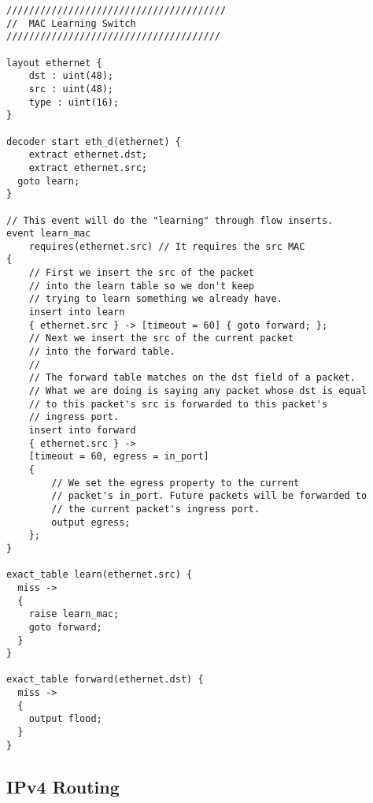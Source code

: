 \begin{lstlisting}
///////////////////////////////////////
//  MAC Learning Switch
//////////////////////////////////////

layout ethernet {
	dst : uint(48);
	src : uint(48);
	type : uint(16);
}

decoder start eth_d(ethernet) {
	extract ethernet.dst;
	extract ethernet.src;
  goto learn;
}

// This event will do the "learning" through flow inserts.
event learn_mac
	requires(ethernet.src) // It requires the src MAC
{
	// First we insert the src of the packet
	// into the learn table so we don't keep
	// trying to learn something we already have.
	insert into learn
	{ ethernet.src } -> [timeout = 60] { goto forward; };
	// Next we insert the src of the current packet
	// into the forward table.
	//
	// The forward table matches on the dst field of a packet.
	// What we are doing is saying any packet whose dst is equal
	// to this packet's src is forwarded to this packet's
	// ingress port.
	insert into forward
	{ ethernet.src } ->
	[timeout = 60, egress = in_port]
	{
		// We set the egress property to the current
		// packet's in_port. Future packets will be forwarded to
		// the current packet's ingress port.
		output egress;
	};
}

exact_table learn(ethernet.src) {
  miss ->
  {
	raise learn_mac;
    goto forward;
  }
}

exact_table forward(ethernet.dst) {
  miss ->
  {
    output flood;
  }
}
\end{lstlisting}


\subsection{IPv4 Routing}

